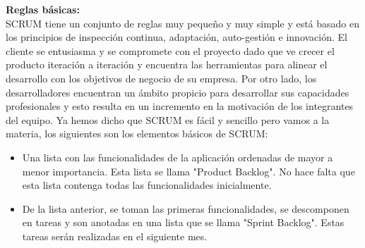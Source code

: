\textbf{Reglas básicas:}\\
SCRUM tiene un conjunto de reglas muy pequeño y muy simple y está basado en los principios de inspección continua, adaptación, auto-gestión e innovación.
El cliente se entusiasma y se compromete con el proyecto dado que ve crecer el producto iteración a iteración y encuentra las herramientas para alinear el desarrollo
con los objetivos de negocio de su empresa.
Por otro lado, los desarrolladores encuentran un ámbito propicio para desarrollar sus capacidades profesionales y esto resulta en un incremento en la motivación de los
integrantes del equipo.
Ya hemos dicho que SCRUM es fácil y sencillo pero vamos a la materia, los siguientes son los elementos básicos de SCRUM:
\begin{itemize}
 \item Una lista con las funcionalidades de la aplicación ordenadas de mayor a menor importancia. Esta lista se llama "Product Backlog". No hace falta que esta lista contenga todas las funcionalidades inicialmente.
 \item De la lista anterior, se toman las primeras funcionalidades, se descomponen en tareas y son anotadas en una lista que se llama "Sprint Backlog". Estas tareas serán realizadas en el siguiente mes.
\end{itemize}

